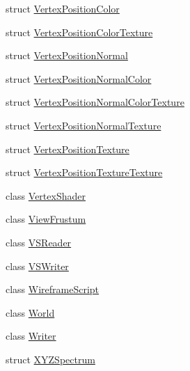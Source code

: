 \begin{DoxyCompactItemize}
struct \hyperlink{structmage_1_1_vertex_position_color}{Vertex\+Position\+Color}
\item 
struct \hyperlink{structmage_1_1_vertex_position_color_texture}{Vertex\+Position\+Color\+Texture}
\item 
struct \hyperlink{structmage_1_1_vertex_position_normal}{Vertex\+Position\+Normal}
\item 
struct \hyperlink{structmage_1_1_vertex_position_normal_color}{Vertex\+Position\+Normal\+Color}
\item 
struct \hyperlink{structmage_1_1_vertex_position_normal_color_texture}{Vertex\+Position\+Normal\+Color\+Texture}
\item 
struct \hyperlink{structmage_1_1_vertex_position_normal_texture}{Vertex\+Position\+Normal\+Texture}
\item 
struct \hyperlink{structmage_1_1_vertex_position_texture}{Vertex\+Position\+Texture}
\item 
struct \hyperlink{structmage_1_1_vertex_position_texture_texture}{Vertex\+Position\+Texture\+Texture}
\item 
class \hyperlink{classmage_1_1_vertex_shader}{Vertex\+Shader}
\item 
class \hyperlink{classmage_1_1_view_frustum}{View\+Frustum}
\item 
class \hyperlink{classmage_1_1_v_s_reader}{V\+S\+Reader}
\item 
class \hyperlink{classmage_1_1_v_s_writer}{V\+S\+Writer}
\item 
class \hyperlink{classmage_1_1_wireframe_script}{Wireframe\+Script}
\item 
class \hyperlink{classmage_1_1_world}{World}
\item 
class \hyperlink{classmage_1_1_writer}{Writer}
\item 
struct \hyperlink{structmage_1_1_x_y_z_spectrum}{X\+Y\+Z\+Spectrum}
\end{DoxyCompactItemize}
